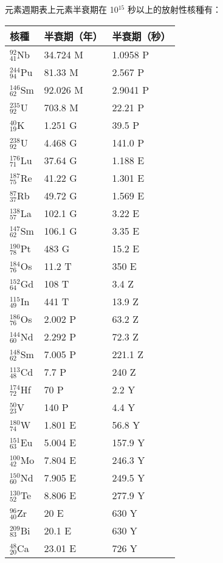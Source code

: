 \documentclass[a4paper,12pt]{article}
\begin{document}
\begin{itemize}
元素週期表上元素半衰期在 10$^{15}$ 秒以上的放射性核種有：
\begin{longtable}[c]{|p{0.25\tw}|p{0.25\tw}|p{0.25\tw}|}
\hline
核種 & 半衰期（年） & 半衰期（秒）\\\hline
$_{41}^{92}$Nb & 34.724 M & 1.0958 P \\\hline
$_{94}^{244}$Pu & 81.33 M & 2.567 P \\\hline
$_{62}^{146}$Sm & 92.026 M & 2.9041 P \\\hline
$_{92}^{235}$U & 703.8  M & 22.21 P \\\hline
$_{19}^{40}$K & 1.251 G & 39.5 P \\\hline
$_{92}^{238}$U & 4.468 G & 141.0 P \\\hline
$_{71}^{176}$Lu & 37.64 G & 1.188 E \\\hline
$_{75}^{187}$Re & 41.22 G & 1.301 E \\\hline
$_{37}^{87}$Rb & 49.72 G & 1.569 E \\\hline
$_{57}^{138}$La & 102.1 G & 3.22 E \\\hline
$_{62}^{147}$Sm & 106.1 G & 3.35 E \\\hline
$_{78}^{190}$Pt & 483 G & 15.2 E \\\hline
$_{76}^{184}$Os & 11.2 T & 350 E \\\hline
$_{64}^{152}$Gd & 108 T & 3.4 Z \\\hline
$_{49}^{115}$In & 441 T & 13.9 Z \\\hline
$_{76}^{186}$Os & 2.002 P & 63.2 Z \\\hline
$_{60}^{144}$Nd & 2.292 P & 72.3 Z \\\hline
$_{62}^{148}$Sm & 7.005 P & 221.1 Z \\\hline
$_{48}^{113}$Cd & 7.7 P & 240 Z \\\hline
$_{72}^{174}$Hf & 70 P & 2.2 Y \\\hline
$_{23}^{50}$V & 140 P & 4.4 Y \\\hline
$_{74}^{180}$W & 1.801 E & 56.8 Y \\\hline
$_{63}^{151}$Eu & 5.004 E & 157.9 Y \\\hline
$_{42}^{100}$Mo & 7.804 E & 246.3 Y \\\hline
$_{60}^{150}$Nd & 7.905 E & 249.5 Y \\\hline
$_{52}^{130}$Te & 8.806 E & 277.9 Y \\\hline
$_{40}^{96}$Zr & 20 E & 630 Y \\\hline
$_{83}^{209}$Bi & 20.1 E & 630 Y \\\hline
$_{20}^{48}$Ca & 23.01 E & 726 Y \\\hline

\end{longtable}
\end{itemize}
\end{document}
